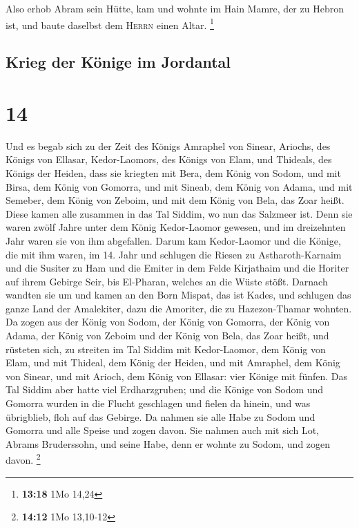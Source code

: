  Also erhob Abram sein Hütte, kam und wohnte im Hain
Mamre, der zu Hebron ist, und baute daselbst dem \textsc{Herrn} einen
Altar. \footnote{\textbf{13:18} 1Mo 14,24}

\hypertarget{krieg-der-kuxf6nige-im-jordantal}{%
\subsection{Krieg der Könige im
Jordantal}\label{krieg-der-kuxf6nige-im-jordantal}}

\hypertarget{section-13}{%
\section{14}\label{section-13}}

 Und es begab sich zu der Zeit des Königs Amraphel von
Sinear, Ariochs, des Königs von Ellasar, Kedor-Laomors, des Königs von
Elam, und Thideals, des Königs der Heiden,  dass sie
kriegten mit Bera, dem König von Sodom, und mit Birsa, dem König von
Gomorra, und mit Sineab, dem König von Adama, und mit Semeber, dem König
von Zeboim, und mit dem König von Bela, das Zoar heißt. 
Diese kamen alle zusammen in das Tal Siddim, wo nun das Salzmeer ist.
 Denn sie waren zwölf Jahre unter dem König Kedor-Laomor
gewesen, und im dreizehnten Jahr waren sie von ihm abgefallen.
 Darum kam Kedor-Laomor und die Könige, die mit ihm waren,
im 14. Jahr und schlugen die Riesen zu Astharoth-Karnaim und die Susiter
zu Ham und die Emiter in dem Felde Kirjathaim  und die
Horiter auf ihrem Gebirge Seir, bis El-Pharan, welches an die Wüste
stößt.  Darnach wandten sie um und kamen an den Born
Mispat, das ist Kades, und schlugen das ganze Land der Amalekiter, dazu
die Amoriter, die zu Hazezon-Thamar wohnten.  Da zogen aus
der König von Sodom, der König von Gomorra, der König von Adama, der
König von Zeboim und der König von Bela, das Zoar heißt, und rüsteten
sich, zu streiten im Tal Siddim  mit Kedor-Laomor, dem
König von Elam, und mit Thideal, dem König der Heiden, und mit Amraphel,
dem König von Sinear, und mit Arioch, dem König von Ellasar: vier Könige
mit fünfen.  Das Tal Siddim aber hatte viel
Erdharzgruben; und die Könige von Sodom und Gomorra wurden in die Flucht
geschlagen und fielen da hinein, und was übrigblieb, floh auf das
Gebirge.  Da nahmen sie alle Habe zu Sodom und Gomorra
und alle Speise und zogen davon.  Sie nahmen auch mit
sich Lot, Abrams Bruderssohn, und seine Habe, denn er wohnte zu Sodom,
und zogen davon. \footnote{\textbf{14:12} 1Mo 13,10-12}

